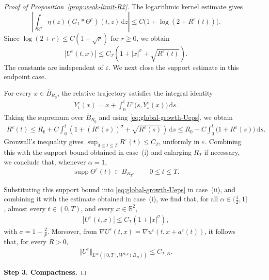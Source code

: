 \documentclass[reqno,11pt,a4paper]{amsart}
\newcommand{\dd}{\mathrm{d}}
\begin{document}
\begin{proof}[Proof of Proposition~\ref{prop:weak-limit-R2}]
The logarithmic kernel estimate gives
\[
  \left|\int_{\mathbb R^2}
    \eta(z)(G_1*\Theta^\varepsilon)(t,z)\,\dd z\right|
  \leq C\bigl(1+\log(2+R^\varepsilon(t))\bigr).
\]
Since $\log(2+r)\leq C(1+\sqrt r)$ for $r\geq0$,
we obtain
\begin{equation}\label{eq:global-growth-Ueps}
  |U^\varepsilon(t,x)|
  \leq C_T\left(1+|x|^\sigma+\sqrt{R^\varepsilon(t)}\right).
\end{equation}
The constants are independent of $\varepsilon$.
We next close the support estimate in this endpoint case.

For every $x\in\overline B_{R_0}$,
the relative trajectory satisfies the integral identity
\begin{align*}
  Y_t^\varepsilon(x) = x + \int_0^t U^\varepsilon\bigl(s,Y_s^\varepsilon(x)\bigr)\,\dd s.
\end{align*}
Taking the supremum over $\overline B_{R_0}$
and using \eqref{eq:global-growth-Ueps}, we obtain
\begin{align*}
  R^\varepsilon(t) \leq R_0 + C\int_0^t \left( 1+(R^\varepsilon(s))^\sigma +\sqrt{R^\varepsilon(s)} \right)\,\dd s \leq R_0 + C\int_0^t \bigl(1+R^\varepsilon(s)\bigr)\,\dd s.
\end{align*}
Gronwall's inequality gives
$\sup_{0\leq t\leq T}R^\varepsilon(t)\leq C_T$,
uniformly in $\varepsilon$.
Combining this with the support bound obtained in case~(i)
and enlarging $R_T$ if necessary, we conclude that,
whenever $\alpha=1$,
\begin{align}\label{eq:The-eps-supp}
  \operatorname{supp}\Theta^\varepsilon(t)\subset B_{R_T},
  \qquad 0\leq t\leq T.
\end{align}

Substituting this support bound into
\eqref{eq:global-growth-Ueps} in case~(ii), and combining
it with the estimate obtained in case~(i), we find that, for all
$\alpha\in(\frac12,1]$, almost every $t\in(0,T)$,
and every $x\in\mathbb R^2$,
\begin{align}\label{eq:U-eps-uppbdd}
  |U^\varepsilon(t,x)|\leq C_T(1+|x|^\sigma),
\end{align}
with $\sigma = 1- \frac{2}{p}$.
Moreover, from $\nabla U^\varepsilon(t,x) = \nabla u^\varepsilon(t,x+a^\varepsilon(t))$, it follows that, for every $R>0$,
\begin{align}\label{eq:local-W1p-Ueps}
  \Vert U^\varepsilon\Vert _{L^\infty([0,T],W^{1,p}(B_R))} \leq C_{T,R}.
\end{align}

\medskip
\noindent\textbf{Step 3. Compactness.}


\end{proof}
\end{document}
